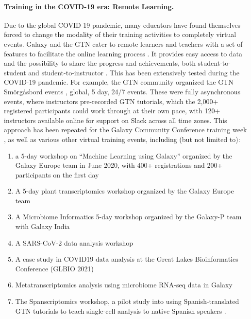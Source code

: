 \paragraph{Training in the COVID-19 era: Remote Learning.}
Due to the global COVID-19 pandemic, many educators have found themselves forced to change the modality of their training activities to completely virtual events.
Galaxy and the GTN cater to remote learners and teachers with a set of features to facilitate the online learning process \cite{GallardoAlba2021}. It provides easy access to data and the possibility to share the progress and achievements, both student-to-student and student-to-instructor \cite{SerranoSolano2020}. This has been extensively tested during the COVID-19 pandemic. 
For example, the GTN community organized the GTN Smörgåsbord events \cite{event-smorg}, global, 5 day, 24/7 events. These were fully asynchronous events, where instructors pre-recorded GTN tutorials, which the 2,000+ registered participants could work through at their own pace, with 120+ instructors available online for support on Slack across all time zones. 
This approach has been repeated for the Galaxy Community Conference training week \cite{event-gcc2021}, as well as various other virtual training events, including (but not limited to): 
\begin{enumerate}
\item a 5-day workshop on ``Machine Learning using Galaxy'' organized by the Galaxy Europe team in June 2020, with 400+ registrations and 200+ participants on the first day \cite{FreiburgGalaxyTeam2020}
\item A 5-day plant transcriptomics workshop organized by the Galaxy Europe team \cite{event-plant}
\item A Microbiome Informatics 5-day workshop organized by the Galaxy-P team with Galaxy India \cite{event-funcmicrobiome}
\item A SARS-CoV-2 data analysis workshop \cite{event-covid}
\item A case study in COVID19 data analysis at the Great Lakes Bioinformatics Conference (GLBIO 2021) \cite{event-lakes}
\item Metatranscriptomics analysis using microbiome RNA-seq data in Galaxy \cite{event-metatranscriptomics}
\item The Spanscriptomics workshop, a pilot study into using Spanish-translated GTN tutorials to teach single-cell analysis to native Spanish speakers \cite{event-spanscriptomics}.
\end{enumerate}


